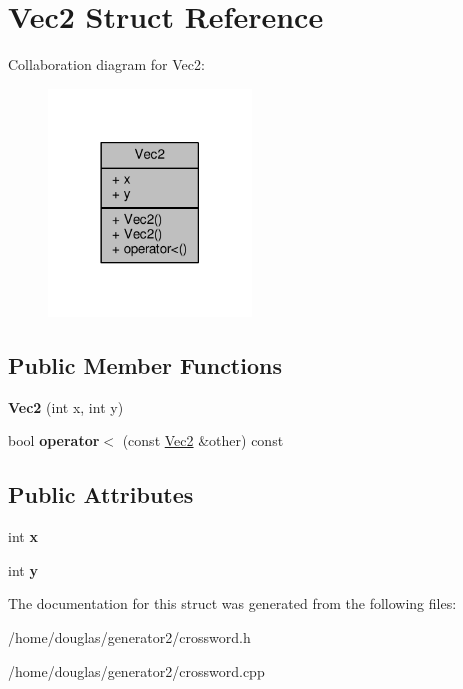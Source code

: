 \hypertarget{structVec2}{}\section{Vec2 Struct Reference}
\label{structVec2}


Collaboration diagram for Vec2\+:
\nopagebreak
\begin{figure}[H]
\begin{center}
\leavevmode
\includegraphics[width=153pt]{structVec2__coll__graph}
\end{center}
\end{figure}
\subsection*{Public Member Functions}
\begin{DoxyCompactItemize}
\item 
{\bfseries Vec2} (int x, int y)\hypertarget{structVec2_a46bd710d890041d8063e87023dff1d41}{}\label{structVec2_a46bd710d890041d8063e87023dff1d41}

\item 
bool {\bfseries operator$<$} (const \hyperlink{structVec2}{Vec2} \&other) const \hypertarget{structVec2_aa61184ba99938e8bb2908ca67a95b36a}{}\label{structVec2_aa61184ba99938e8bb2908ca67a95b36a}

\end{DoxyCompactItemize}
\subsection*{Public Attributes}
\begin{DoxyCompactItemize}
\item 
int {\bfseries x}\hypertarget{structVec2_ae76e144847d9ef65bd288df4dc83f8a3}{}\label{structVec2_ae76e144847d9ef65bd288df4dc83f8a3}

\item 
int {\bfseries y}\hypertarget{structVec2_af8c49fd3e96353c332024c4c48057539}{}\label{structVec2_af8c49fd3e96353c332024c4c48057539}

\end{DoxyCompactItemize}


The documentation for this struct was generated from the following files\+:\begin{DoxyCompactItemize}
\item 
/home/douglas/generator2/crossword.\+h\item 
/home/douglas/generator2/crossword.\+cpp\end{DoxyCompactItemize}
